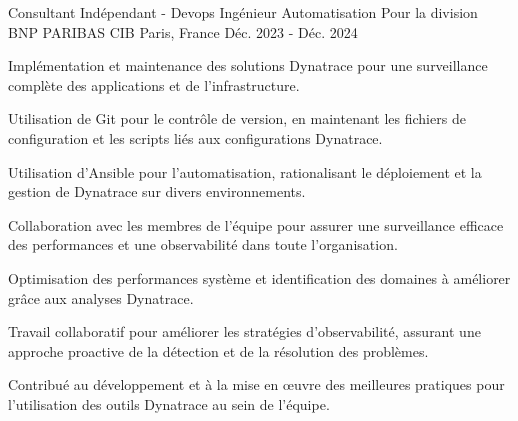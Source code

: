 
\begin{cventries}

  \cventry
    {Consultant Indépendant - Devops Ingénieur Automatisation}  %
    {Pour la division BNP PARIBAS CIB} %
    {Paris, France} %
    {Déc. 2023 - Déc. 2024} %
    {
      \begin{cvitems} %
        \item {Implémentation et maintenance des solutions Dynatrace pour une surveillance complète des applications et de l'infrastructure.}
        \item {Utilisation de Git pour le contrôle de version, en maintenant les fichiers de configuration et les scripts liés aux configurations Dynatrace.}
        \item {Utilisation d'Ansible pour l'automatisation, rationalisant le déploiement et la gestion de Dynatrace sur divers environnements.}
        \item {Collaboration avec les membres de l'équipe pour assurer une surveillance efficace des performances et une observabilité dans toute l'organisation.}
        \item {Optimisation des performances système et identification des domaines à améliorer grâce aux analyses Dynatrace.}
        \item {Travail collaboratif pour améliorer les stratégies d'observabilité, assurant une approche proactive de la détection et de la résolution des problèmes.}
        \item {Contribué au développement et à la mise en œuvre des meilleures pratiques pour l'utilisation des outils Dynatrace au sein de l'équipe.}
      \end{cvitems}
    }


\end{cventries}
